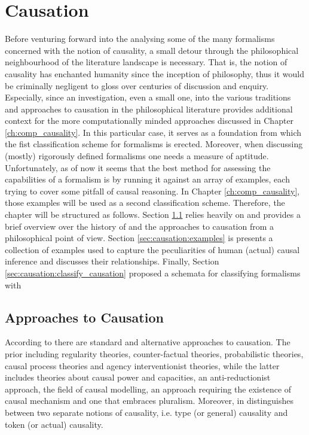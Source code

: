 \documentclass[11pt,a4paper]{book}
\theoremstyle{definition}
\theoremstyle{definition}
\theoremstyle{definition}
\theoremstyle{remark}
\begin{document}
\chapter{Causation}
Before venturing forward into the analysing some of the many formalisms concerned with the notion of causality, a small detour through the philosophical neighbourhood of the literature landscape is necessary. 
That is, the notion of causality has enchanted humanity since the inception of philosophy, thus it would be criminally negligent to gloss over centuries of discussion and enquiry.  
Especially, since an investigation, even a small one, into the various traditions and approaches to causation in the philosophical literature provides additional context for the more computationally minded approaches discussed in 
Chapter \ref{ch:comp_causality}. In this particular case, it serves as a foundation from which the fist classification scheme for formalisms is erected. 
Moreover, when discussing (mostly) rigorously defined formalisms one needs a measure of aptitude.  Unfortunately, as of now it seems that the best method for assessing the capabilities of a formalism is by running it against an array of examples, each trying to cover some pitfall of causal reasoning. In Chapter \ref{ch:comp_causality}, those examples will be used as a second classification scheme. 
Therefore, the chapter will be structured as follows. Section \ref{sec:causation:approaches_to_causation} relies heavily on \cite{beebee2009oxford} and provides a brief overview over the history of and the approaches to causation from a philosophical point of view. Section \ref{sec:causation:examples} is presents a collection of examples used to capture the peculiarities of human (actual) causal inference and discusses their relationships. 
Finally, Section \ref{sec:causation:classify_causation} proposed a schemata for classifying formalisms  with

\section{Approaches to Causation}
\label{sec:causation:approaches_to_causation}
According to \cite{beebee2009oxford} there are standard and alternative approaches to causation. The prior including regularity theories, counter-factual theories, probabilistic theories, causal process theories and agency interventionist theories, while the latter includes theories about causal power and capacities, an anti-reductionist approach, the field of causal modelling, an approach requiring the existence of causal mechanism and one that embraces pluralism. Moreover, in \cite{halpern2016actual} distinguishes between two separate notions of causality, i.e. type (or general) causality and token (or actual) causality. 
\end{document}
